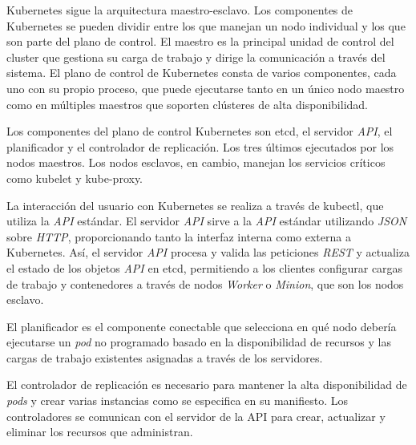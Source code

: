 Kubernetes sigue la arquitectura maestro-esclavo. Los componentes de Kubernetes se pueden dividir entre los que manejan un nodo individual y los que son parte del plano de control. El maestro es la principal unidad de control del cluster que gestiona su carga de trabajo y dirige la comunicación a través del sistema. El plano de control de Kubernetes consta de varios componentes, cada uno con su propio proceso, que puede ejecutarse tanto en un único nodo maestro como en múltiples maestros que soporten clústeres de alta disponibilidad.

Los componentes del plano de control Kubernetes son etcd, el servidor \textit{API}, el planificador y el controlador de replicación. Los tres últimos ejecutados por los nodos maestros. Los nodos esclavos, en cambio, manejan los servicios críticos como kubelet y kube-proxy.

La interacción del usuario con Kubernetes se realiza a través de kubectl, que utiliza la \textit{API} estándar. El servidor \textit{API} sirve a la \textit{API} estándar utilizando \textit{JSON} sobre \textit{HTTP}, proporcionando tanto la interfaz interna como externa a Kubernetes. Así, el servidor \textit{API} procesa y valida las peticiones \textit{REST} y actualiza el estado de los objetos \textit{API} en etcd, permitiendo a los clientes configurar cargas de trabajo y contenedores a través de nodos \textit{Worker} o \textit{Minion}, que son los nodos esclavo. 

El planificador es el componente conectable que selecciona en qué nodo debería ejecutarse un \textit{pod} no programado basado en la disponibilidad de recursos y las cargas de trabajo existentes asignadas a través de los servidores.


El controlador de replicación es necesario para mantener la alta disponibilidad de \textit{pods} y crear varias instancias como se especifica en su manifiesto. Los controladores se comunican con el servidor de la API para crear, actualizar y eliminar los recursos que administran. 

